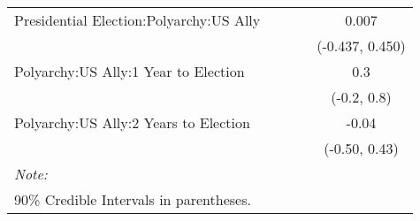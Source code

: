 \begin{table}[H]
{\begin{tabular}[t]{lcccc}
Presidential Election:Polyarchy:US Ally &  &  &  & 0.007\\
 &  &  &  & (-0.437, 0.450)\\
Polyarchy:US Ally:1 Year to Election &  &  &  & 0.3\\
 &  &  &  & (-0.2, 0.8)\\
Polyarchy:US Ally:2 Years to Election &  &  &  & -0.04\\
 &  &  &  & (-0.50, 0.43)\\
\bottomrule
\multicolumn{5}{l}{\rule{0pt}{1em}\textit{Note: }}\\
\multicolumn{5}{l}{\rule{0pt}{1em}90\% Credible Intervals in parentheses.}\\
\end{tabular}}
\end{table}

